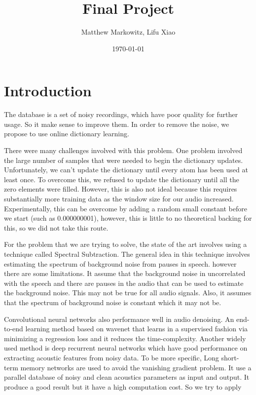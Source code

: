 \documentclass[UTF8]{article}
\title{Final Project}
\author{Matthew Markowitz, Lifu Xiao}
\date{\today}
\begin{document}
\maketitle


\section{Introduction}
The database is a set of noisy recordings\cite{valentini2017noisy}, which have poor quality for further usage.  So it make sense  to improve them. In order to remove the noise, we propose to use online dictionary learning\cite{mairal2010online}.


There were many challenges involved with this problem. One problem involved the large number of samples that were needed to begin the dictionary updates. Unfortunately, we can't update the dictionary until every atom has been used at least once. To overcome this, we refused to update the dictionary until all the zero elements were filled. However, this is also not ideal because this requires substantially more training data as the window size for our audio increased. Experimentally, this can be overcome by adding a random small constant before we start (such as 0.000000001), however, this is little to no theoretical backing for this, so we did not take this route.


For the problem that we are trying to solve, the state of the art involves using a technique called Spectral Subtraction\cite{upadhyay2015speech}. The general idea in this technique involves estimating the spectrum of background noise from pauses in speech. however there are some limitations. It assume that the background noise in uncorrelated with the speech and there are pauses in the audio that can be used to estimate the background noise. This may not be true for all audio signals. Also, it assumes that the spectrum of background noise is constant which it may not be.


Convolutional neural networks also performance well in audio denoising. An end-to-end learning method based on wavenet\cite{rethage2018wavenet} that learns in a supervised fashion via minimizing a regression loss and it reduces the time-complexity. Another widely used method is deep recurrent neural networks\cite{valentini2016speech} which have good performance on extracting acoustic features from noisy data. To be more specific, Long short-term memory networks are used to avoid the vanishing gradient problem. It use a parallel database of noisy and clean acoustics parameters as input and output. It produce a good result but it have a high computation cost. So we try to apply 
\end{document}
